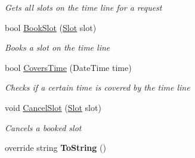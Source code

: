 \begin{DoxyCompactItemize}
\begin{DoxyCompactList}\small\item\em Gets all slots on the time line for a request \end{DoxyCompactList}\item 
bool \hyperlink{class_general_health_care_elements_1_1_booking_models_1_1_single_per_day_time_line_ad3d3aadd0080d53873952b79f21ffc1e}{Book\+Slot} (\hyperlink{class_general_health_care_elements_1_1_booking_models_1_1_slot}{Slot} slot)
\begin{DoxyCompactList}\small\item\em Books a slot on the time line \end{DoxyCompactList}\item 
bool \hyperlink{class_general_health_care_elements_1_1_booking_models_1_1_single_per_day_time_line_a9fed465374f3d1f763d7c5ac5f488597}{Covers\+Time} (Date\+Time time)
\begin{DoxyCompactList}\small\item\em Checks if a certain time is covered by the time line \end{DoxyCompactList}\item 
void \hyperlink{class_general_health_care_elements_1_1_booking_models_1_1_single_per_day_time_line_a3554277c6d02bc1f6353aa3b6156468c}{Cancel\+Slot} (\hyperlink{class_general_health_care_elements_1_1_booking_models_1_1_slot}{Slot} slot)
\begin{DoxyCompactList}\small\item\em Cancels a booked slot \end{DoxyCompactList}\item 
override string {\bfseries To\+String} ()\hypertarget{class_general_health_care_elements_1_1_booking_models_1_1_single_per_day_time_line_a221249b348cf2a525dcecbb2686fcee0}{}\label{class_general_health_care_elements_1_1_booking_models_1_1_single_per_day_time_line_a221249b348cf2a525dcecbb2686fcee0}

\end{DoxyCompactItemize}
